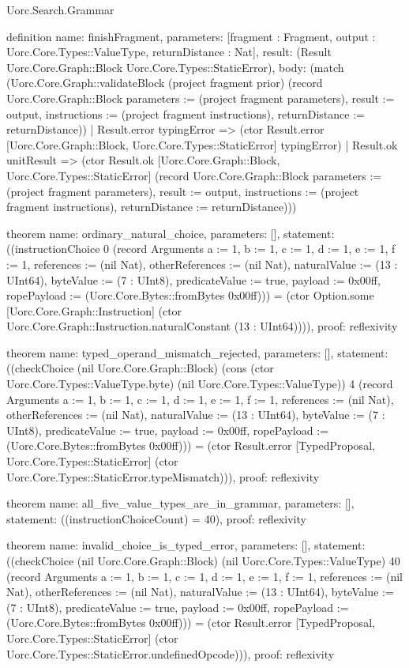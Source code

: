 \begin{lexlean}{Uorc.Search.Grammar}
\begin{semanticmodule}
definition{
  name: finishFragment,
  parameters: [fragment : Fragment, output : Uorc.Core.Types::ValueType, returnDistance : Nat],
  result: (Result Uorc.Core.Graph::Block Uorc.Core.Types::StaticError),
  body: (match (Uorc.Core.Graph::validateBlock (project fragment prior) (record Uorc.Core.Graph::Block {parameters := (project fragment parameters), result := output, instructions := (project fragment instructions), returnDistance := returnDistance}))
    | Result.error typingError => (ctor Result.error [Uorc.Core.Graph::Block, Uorc.Core.Types::StaticError] typingError)
    | Result.ok unitResult => (ctor Result.ok [Uorc.Core.Graph::Block, Uorc.Core.Types::StaticError] (record Uorc.Core.Graph::Block {parameters := (project fragment parameters), result := output, instructions := (project fragment instructions), returnDistance := returnDistance})))
}

theorem{
  name: ordinary_natural_choice,
  parameters: [],
  statement: ((instructionChoice 0 (record Arguments {a := 1, b := 1, c := 1, d := 1, e := 1, f := 1, references := (nil Nat), otherReferences := (nil Nat), naturalValue := (13 : UInt64), byteValue := (7 : UInt8), predicateValue := true, payload := 0x00ff, ropePayload := (Uorc.Core.Bytes::fromBytes 0x00ff)})) = (ctor Option.some [Uorc.Core.Graph::Instruction] (ctor Uorc.Core.Graph::Instruction.naturalConstant (13 : UInt64)))),
  proof: reflexivity{}
}

theorem{
  name: typed_operand_mismatch_rejected,
  parameters: [],
  statement: ((checkChoice (nil Uorc.Core.Graph::Block) (cons (ctor Uorc.Core.Types::ValueType.byte) (nil Uorc.Core.Types::ValueType)) 4 (record Arguments {a := 1, b := 1, c := 1, d := 1, e := 1, f := 1, references := (nil Nat), otherReferences := (nil Nat), naturalValue := (13 : UInt64), byteValue := (7 : UInt8), predicateValue := true, payload := 0x00ff, ropePayload := (Uorc.Core.Bytes::fromBytes 0x00ff)})) = (ctor Result.error [TypedProposal, Uorc.Core.Types::StaticError] (ctor Uorc.Core.Types::StaticError.typeMismatch))),
  proof: reflexivity{}
}

theorem{
  name: all_five_value_types_are_in_grammar,
  parameters: [],
  statement: ((instructionChoiceCount) = 40),
  proof: reflexivity{}
}

theorem{
  name: invalid_choice_is_typed_error,
  parameters: [],
  statement: ((checkChoice (nil Uorc.Core.Graph::Block) (nil Uorc.Core.Types::ValueType) 40 (record Arguments {a := 1, b := 1, c := 1, d := 1, e := 1, f := 1, references := (nil Nat), otherReferences := (nil Nat), naturalValue := (13 : UInt64), byteValue := (7 : UInt8), predicateValue := true, payload := 0x00ff, ropePayload := (Uorc.Core.Bytes::fromBytes 0x00ff)})) = (ctor Result.error [TypedProposal, Uorc.Core.Types::StaticError] (ctor Uorc.Core.Types::StaticError.undefinedOpcode))),
  proof: reflexivity{}
}
\end{semanticmodule}
\end{lexlean}
